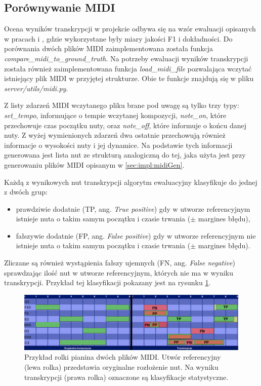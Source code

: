 \documentclass[12pt,a4paper,twoside]{mwart}
\begin{document}
\subsection{Porównywanie MIDI}\label{sec:impl:midiCompare}
Ocena wyników transkrypcji w projekcie odbywa się na wzór ewaluacji opisanych w pracach \cite[3]{Transcription:Pertus:Inharmonicity} i \cite[8]{Transcription:Pertus:Inharmonicity2}, gdzie wykorzystane były miary jakości F1 i dokładności. Do porównania dwóch plików MIDI zaimplementowana została funkcja \textit{compare\_midi\_to\_ground\_truth}. Na potrzeby ewaluacji wyników transkrypcji została również zaimplementowana funkcja \textit{load\_midi\_file} pozwalająca wczytać istniejący plik MIDI w przyjętej strukturze. Obie te funkcje znajdują się w pliku \textit{server/utils/midi.py}.

Z listy zdarzeń MIDI wczytanego pliku brane pod uwagę są tylko trzy typy: \textit{set\_tempo}, informujące o tempie wczytanej kompozycji, \textit{note\_on}, które przechowuje czas początku nuty, oraz \textit{note\_off}, które informuje o końcu danej nuty. Z wyżej wymienionych zdarzeń dwa ostatnie przechowują również informacje o wysokości nuty i jej dynamice. Na podstawie tych informacji generowana jest lista nut ze strukturą analogiczną do tej, jaka użyta jest przy generowaniu plików MIDI opisanym w \ref{sec:impl:midiGen}.

Każdą z wynikowych nut transkrypcji algorytm ewaluacyjny klasyfikuje do jednej z dwóch grup:
\begin{itemize}
  \item prawdziwie dodatnie (TP, ang. \textit{True positive}) gdy w utworze referencyjnym istnieje nuta o takim samym początku i czasie trwania ($\pm$ margines błędu),
  \item fałszywie dodatnie (FP, ang. \textit{False positive}) gdy w utworze referencyjnym nie istnieje nuta o takim samym początku i czasie trwania ($\pm$ margines błędu).
\end{itemize} 
Zliczane są również wystąpienia fałszy ujemnych (FN, ang. \textit{False negative}) sprawdzając ilość nut w utworze referencyjnym, których nie ma w wyniku transkrypcji. Przykład tej klasyfikacji pokazany jest na rysunku \ref{fig:f1}.

\begin{figure}[H]
  \begin{center}
    \includegraphics[scale=0.21]{images/TranscriptionStatisticF1Measure.jpg}
    \caption{Przykład rolki pianina dwóch plików MIDI. Utwór referencyjny (lewa rolka) przedstawia oryginalne rozłożenie nut. Na wyniku transkrypcji (prawa rolka) oznaczone są klasyfikacje statystyczne.}
    \label{fig:f1}
  \end{center}
\end{figure}
\end{document}
